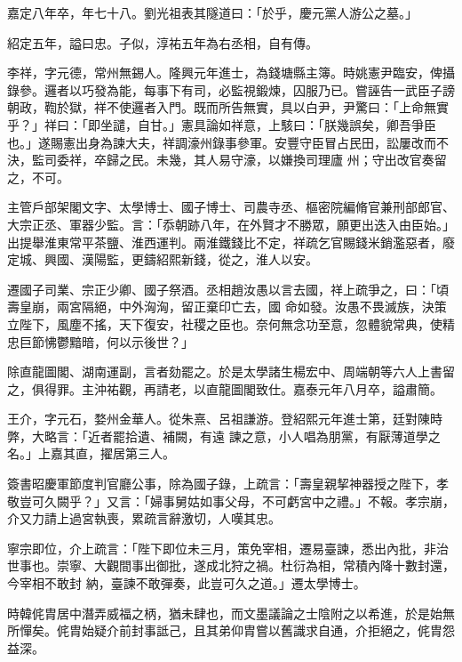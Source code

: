 \begin{pinyinscope}
 嘉定八年卒，年七十八。劉光祖表其隧道曰：「於乎，慶元黨人游公之墓。」



 紹定五年，謚曰忠。子似，淳祐五年為右丞相，自有傳。



 李祥，字元德，常州無錫人。隆興元年進士，為錢塘縣主簿。時姚憲尹臨安，俾攝錄參。邏者以巧發為能，每事下有司，必監視鍛煉，囚服乃已。嘗誣告一武臣子謗朝政，鞫於獄，祥不使邏者入門。既而所告無實，具以白尹，尹驚曰：「上命無實乎？」祥曰：「即坐譴，自甘。」憲具論如祥意，上駭曰：「朕幾誤矣，卿吾爭臣也。」遂賜憲出身為諫大夫，祥調濠州錄事參軍。安豐守臣冒占民田，訟屢改而不決，監司委祥，卒歸之民。未幾，其人易守濠，以嫌換司理廬
 州；守出改官奏留之，不可。



 主管戶部架閣文字、太學博士、國子博士、司農寺丞、樞密院編脩官兼刑部郎官、大宗正丞、軍器少監。言：「忝朝跡八年，在外賢才不勝眾，願更出迭入由臣始。」出提舉淮東常平茶鹽、淮西運判。兩淮鐵錢比不定，祥疏乞官賜錢米銷濫惡者，廢定城、興國、漢陽監，更鑄紹熙新錢，從之，淮人以安。



 遷國子司業、宗正少卿、國子祭酒。丞相趙汝愚以言去國，祥上疏爭之，曰：「頃壽皇崩，兩宮隔絕，中外洶洶，留正棄印亡去，國
 命如發。汝愚不畏滅族，決策立陛下，風塵不搖，天下復安，社稷之臣也。奈何無念功至意，忽體貌常典，使精忠巨節怫鬱黯暗，何以示後世？」



 除直龍圖閣、湖南運副，言者劾罷之。於是太學諸生楊宏中、周端朝等六人上書留之，俱得罪。主沖祐觀，再請老，以直龍圖閣致仕。嘉泰元年八月卒，謚肅簡。



 王介，字元石，婺州金華人。從朱熹、呂祖謙游。登紹熙元年進士第，廷對陳時弊，大略言：「近者罷拾遺、補闕，有遠
 諫之意，小人唱為朋黨，有厭薄道學之名。」上嘉其直，擢居第三人。



 簽書昭慶軍節度判官廳公事，除為國子錄，上疏言：「壽皇親挈神器授之陛下，孝敬豈可久闕乎？」又言：「婦事舅姑如事父母，不可虧宮中之禮。」不報。孝宗崩，介又力請上過宮執喪，累疏言辭激切，人嘆其忠。



 寧宗即位，介上疏言：「陛下即位未三月，策免宰相，遷易臺諫，悉出內批，非治世事也。崇寧、大觀間事出御批，遂成北狩之禍。杜衍為相，常積內降十數封還，今宰相不敢封
 納，臺諫不敢彈奏，此豈可久之道。」遷太學博士。



 時韓侂胄居中潛弄威福之柄，猶未肆也，而文墨議論之士陰附之以希進，於是始無所憚矣。侂胄始疑介前封事詆己，且其弟仰胄嘗以舊識求自通，介拒絕之，侂胄怨益深。




\end{pinyinscope}

